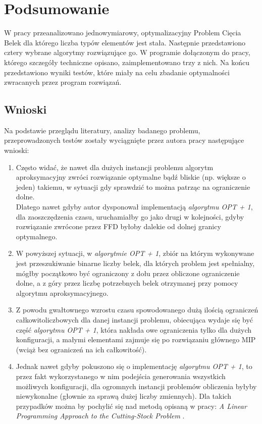 \chapter{Podsumowanie}
\thispagestyle{chapterBeginStyle}
\label{ch:SUMMARY}

W pracy przeanalizowano jednowymiarowy, optymalizacyjny Problem Cięcia Belek dla którego liczba typów elementów jest stała. 
Następnie przedstawiono cztery wybrane algorytmy rozwiązujące go. W programie dołączonym do pracy, którego szczegóły techniczne opisano, zaimplementowano trzy z nich. Na końcu przedstawiono wyniki testów, które miały na celu zbadanie optymalności zwracanych przez program rozwiązań.

\section{Wnioski}
Na podstawie przeglądu literatury, analizy badanego problemu, przeprowadzonych testów zostały wyciągnięte  przez autora pracy następujące wnioski:
\begin{enumerate}
	\item Często widać, że nawet dla dużych instancji problemu algorytm aproksymacyjny zwróci rozwiązanie optymalne bądź bliskie (np. większe o jeden) takiemu, w sytuacji gdy sprawdzić to można patrząc na ograniczenie dolne. \\
	Dlatego nawet gdyby autor dysponował implementacją \textit{algorytmu OPT + 1}, dla zaoszczędzenia czasu, uruchamiałby go jako drugi w kolejności, gdyby rozwiązanie zwrócone przez FFD byłoby dalekie od dolnej granicy optymalnego.
	\item W powyższej sytuacji, w \textit{algorytmie OPT + 1}, zbiór na którym wykonywane jest przeszukiwanie binarne liczby belek, dla których problem jest spełnialny, mógłby początkowo być ograniczony z dołu przez obliczone ograniczenie dolne, a z góry przez liczbę potrzebnych belek otrzymanej przy pomocy algorytmu aproksymacyjnego.
	\item Z powodu gwałtownego wzrostu czasu spowodowanego dużą ilością ograniczeń całkowitoliczbowych dla danej instancji problemu, obiecująca wydaje się być część \textit{algorytmu OPT + 1}, która nakłada owe ograniczenia tylko dla dużych konfiguracji, a małymi elementami zajmuje się po rozwiązaniu głównego MIP (wciąż bez ograniczeń na ich całkowitość).
	\item Jednak nawet gdyby pokuszono się o implementację \textit{algorytmu OPT + 1}, to przez fakt wykorzystanego w nim podejścia generowania wszystkich możliwych konfiguracji, dla ogromnych instancji problemów obliczenia byłyby niewykonalne (głownie za sprawą dużej liczby zmiennych). Dla takich przypadków można by pochylić się nad metodą opisaną w pracy: \textit{A Linear Programming Approach to the Cutting-Stock Problem} \cite{GOMORY}.

\end{enumerate}


